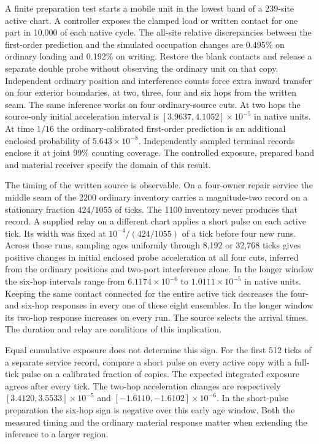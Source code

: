 \documentclass[11pt]{article}
\begin{document}
A finite preparation test starts a mobile unit in the lowest band of a
239-site active chart. A controller exposes the clamped load or written
contact for one part in 10,000 of each native cycle. The all-site
relative discrepancies between the first-order prediction and the
simulated occupation changes are 0.495\% on ordinary loading and
0.192\% on writing. Restore the blank contacts and release a separate
double probe without observing the ordinary unit on that copy.
Independent ordinary position and interference counts force extra
inward transfer on four exterior boundaries, at two, three, four and
six hops from the written seam. The same inference works on four
ordinary-source cuts. At two hops the source-only initial acceleration
interval is $[3.9637,4.1052]\times10^{-5}$ in native units. At time
$1/16$ the ordinary-calibrated first-order prediction is an additional
enclosed probability of $5.643\times10^{-8}$. Independently sampled
terminal records enclose it at joint 99\% counting coverage. The
controlled exposure, prepared band and material receiver specify the
domain of this result.

The timing of the written source is observable. On a four-owner
repair service the middle seam of the 2200 ordinary inventory carries
a magnitude-two record on a stationary fraction $424/1055$ of ticks.
The 1100 inventory never produces that record. A supplied relay on a
different chart applies a short pulse on each active tick. Its width
was fixed at $10^{-4}/(424/1055)$ of a tick before four new runs.
Across those runs, sampling ages uniformly through 8,192 or 32,768
ticks gives positive changes in initial enclosed probe acceleration
at all four cuts, inferred from the ordinary positions and two-port
interference alone. In the longer window the six-hop intervals range
from $6.1174\times10^{-6}$ to $1.0111\times10^{-5}$ in native units.
Keeping the same contact connected for the entire active tick
decreases the four- and six-hop responses in every one of these
eight ensembles. In the longer window its two-hop response increases
on every run. The source selects the arrival times. The duration
and relay are conditions of this implication.

Equal cumulative exposure does not determine this sign. For the
first 512 ticks of a separate service record, compare a short
pulse on every active copy with a full-tick pulse on a calibrated
fraction of copies. The expected integrated exposure agrees after
every tick. The two-hop acceleration changes are respectively
$[3.4120,3.5533]\times10^{-5}$ and
$[-1.6110,-1.6102]\times10^{-6}$. In the short-pulse preparation
the six-hop sign is negative over this early age window.
Both the measured timing and the ordinary material response matter
when extending the inference to a larger region.
\end{document}
